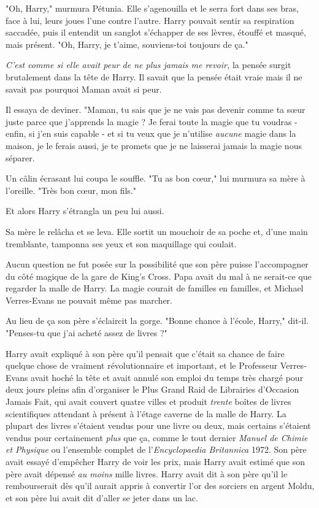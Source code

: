 "Oh, Harry," murmura Pétunia. Elle s'agenouilla et le serra fort dans ses bras, face à lui, leurs joues l'une contre l'autre. Harry pouvait sentir sa respiration saccadée, puis il entendit un sanglot s'échapper de ses lèvres, étouffé et masqué, mais présent. "Oh, Harry, je t'aime, souviens-toi toujours de ça."

\emph{C'est comme si elle avait peur de ne plus jamais me revoir,}  la pensée surgit brutalement dans la tête de Harry. Il savait que la pensée était vraie mais il ne savait pas pourquoi Maman avait si peur.

Il essaya de deviner. "Maman, tu sais que je ne vais pas devenir comme ta sœur juste parce que j'apprends la magie ? Je ferai toute la magie que tu voudras - enfin, si j'en suis capable - et si tu veux que je n'utilise \emph{aucune}  magie dans la maison, je le ferais aussi, je te promets que je ne laisserai jamais la magie nous séparer.

Un câlin écrasant lui coupa le souffle. "Tu as bon cœur," lui murmura sa mère à l'oreille. "Très bon cœur, mon fils."

Et alors Harry s'étrangla un peu lui aussi.

Sa mère le relâcha et se leva. Elle sortit un mouchoir de sa poche et, d'une main tremblante, tamponna ses yeux et son maquillage qui coulait.

Aucun question ne fut posée sur la possibilité que son père puisse l'accompagner du côté magique de la gare de King's Cross. Papa avait du mal à ne serait-ce que regarder la malle de Harry. La magie courait de familles en familles, et Michael Verres-Evans ne pouvait même pas marcher.

Au lieu de ça son père s'éclaircit la gorge. "Bonne chance à l'école, Harry," dit-il. "Penses-tu que j'ai acheté assez de livres ?"

Harry avait expliqué à son père qu'il pensait que c'était sa chance de faire quelque chose de vraiment révolutionnaire et important, et le Professeur Verres-Evans avait hoché la tête et avait annulé son emploi du temps très chargé pour deux jours pleins afin d'organiser le Plus Grand Raid de Librairies d'Occasion Jamais Fait, qui avait couvert quatre villes et produit \emph{trente}  boîtes de livres scientifiques attendant à présent à l'étage caverne de la malle de Harry. La plupart des livres s'étaient vendus pour une livre ou deux, mais certains s'étaient vendus pour certainement \emph{plus}  que ça, comme le tout dernier \emph{Manuel de Chimie et Physique}  ou l'ensemble complet de l'\emph{Encyclopaedia Britannica}  1972. Son père avait essayé d'empêcher Harry de voir les prix, mais Harry avait estimé que son père avait dépensé \emph{au moins}  mille livres. Harry avait dit à son père qu'il le rembourserait dès qu'il aurait appris à convertir l'or des sorciers en argent Moldu, et son père lui avait dit d'aller se jeter dans un lac.

